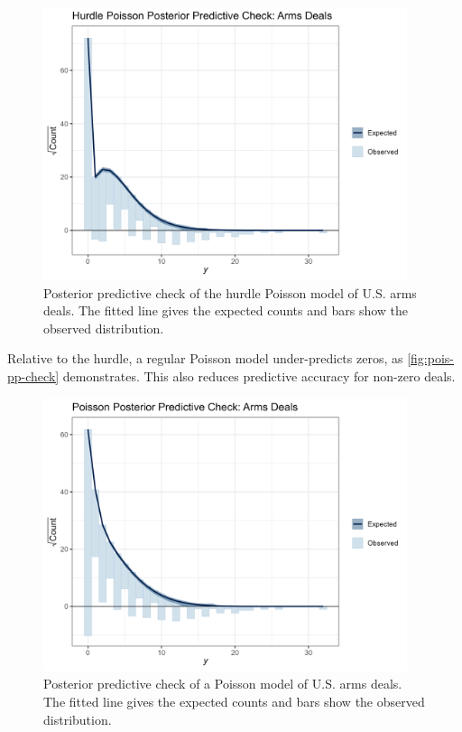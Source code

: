 \documentclass[12pt]{article}
\begin{document}
\begin{figure}[htpb]
	\centering
		\includegraphics[width=0.95\textwidth]{pp-check-deals.png}
	\caption{Posterior predictive check of the hurdle Poisson model of U.S. arms deals. The fitted line gives the expected counts and bars show the observed distribution.}
	\label{fig:pp-check-deals}
\end{figure}


Relative to the hurdle, a regular Poisson model under-predicts zeros, as \autoref{fig:pois-pp-check} demonstrates. 
This also reduces predictive accuracy for non-zero deals. 


\begin{figure}[htpb]
	\centering
		\includegraphics[width=0.95\textwidth]{pois-pp-check.png}
	\caption{Posterior predictive check of a Poisson model of U.S. arms deals. The fitted line gives the expected counts and bars show the observed distribution.}
	\label{fig:pois-pp-check}
\end{figure}
\end{document}
